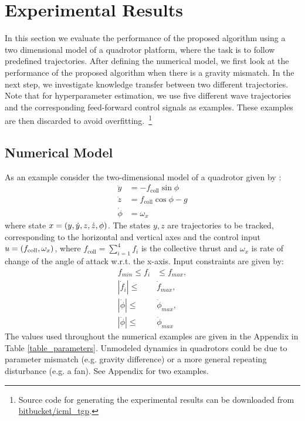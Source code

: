 \section{Experimental Results}\label{sec:numerical_examples}
\label{Results1}
In this section we evaluate the performance of the proposed algorithm using a two dimensional model of a quadrotor platform, where the task is to follow predefined trajectories. After defining the numerical model, we first look at the performance of the proposed algorithm when there is a gravity mismatch. In the next step, we investigate knowledge transfer between two different trajectories. Note that for hyperparameter estimation, we use five different wave trajectories and the corresponding feed-forward control signals as examples. These examples are then discarded to avoid overfitting.~\footnote{Source code for generating the experimental results can be downloaded from \href{https://icml_tgp@bitbucket.org/icml_tgp/icml_tgp.git}{bitbucket/icml\_tgp}.}

\subsection{Numerical Model}
As an example consider the two-dimensional model of a quadrotor given by \citet{Schoellig12}:	
\begin{equation}
\begin{aligned}
\ddot{y} &= -f_{\mathrm{coll}} \sin\phi  \\
\ddot{z} &=  f_{\mathrm{coll}}\cos\phi - g  \\
\dot{\phi} &= \omega_{x} 
\end{aligned}
\label{quadrocopterDynamics}
\end{equation}
where state $x = (y,\dot{y},z,\dot{z},\phi)$. The states $y, z$ are trajectories to be tracked, corresponding to the horizontal and vertical axes and the control input $u = (f_{\mathrm{coll}}, \omega_x)$, where $f_{\mathrm{coll}} = \sum_{i=1}^{4}f_{i}$ is the collective thrust and $\omega_x$ is rate of change of the angle of attack w.r.t. the x-axis.
Input constraints are given by: 
\begin{align*}
f_{min} \leq f_i &\leq f_{max}, \\
|\dot{f}_i| \leq &\dot{f}_{max}, \\
|\dot{\phi}| \leq &\dot{\phi}_{max}, \\
|\ddot{\phi}| \leq &\ddot{\phi}_{max}
\end{align*}
The values used throughout the numerical examples are given in the Appendix in Table \ref{table_parameters}. Unmodeled dynamics in quadrotors could be due to parameter mismatch (e.g. gravity difference) or a more general repeating disturbance (e.g. a fan). See Appendix for two examples.

